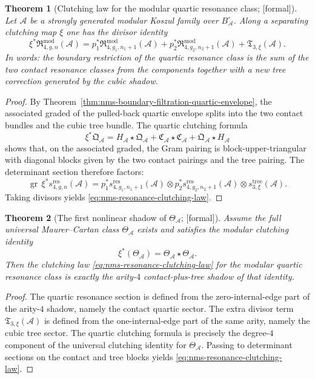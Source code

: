 \documentclass[11pt,oneside]{memoir}
\numberwithin{equation}{chapter}
\newtheorem{theorem}{Theorem}[chapter]
\theoremstyle{definition}
\newcommand{\ClaimStatusProvedHere}{\textnormal{[formal]}}
\newcommand{\cA}{\mathcal A}
\begin{document}
\begin{theorem}[Clutching law for the modular quartic resonance class; \ClaimStatusProvedHere]
\label{thm:nms-clutching-law-modular-resonance}
Let $\cA$ be a strongly generated modular Koszul family over $B_{\cA}^{\circ}$.  Along a separating clutching map $\xi$ one has the divisor identity
\begin{equation}
\label{eq:nms-resonance-clutching-law}
\xi^*\mathfrak R_{4,g,n}^{\mathrm{mod}}(\cA)
=
p_1^*\mathfrak R_{4,g_1,n_1+1}^{\mathrm{mod}}(\cA)
+
p_2^*\mathfrak R_{4,g_2,n_2+1}^{\mathrm{mod}}(\cA)
+
\mathfrak T_{3,\xi}(\cA).
\end{equation}
In words: the boundary restriction of the quartic resonance class is the sum of the two contact resonance classes from the components together with a new tree correction generated by the cubic shadow.
\end{theorem}

\begin{proof}
By Theorem~\ref{thm:nms-boundary-filtration-quartic-envelope}, the associated graded of the pulled-back quartic envelope splits into the two contact bundles and the cubic tree bundle.  The quartic clutching formula
\[
\xi^*\mathfrak Q_{\cA}
=
H_{\cA}\star\mathfrak Q_{\cA}
+
\mathfrak C_{\cA}\star\mathfrak C_{\cA}
+
\mathfrak Q_{\cA}\star H_{\cA}
\]
shows that, on the associated graded, the Gram pairing is block-upper-triangular with diagonal blocks given by the two contact pairings and the tree pairing.  The determinant section therefore factors:
\[
\operatorname{gr}\,\xi^*s_{4,g,n}^{\mathrm{res}}(\cA)
=
p_1^*s_{4,g_1,n_1+1}^{\mathrm{res}}(\cA)
\otimes
p_2^*s_{4,g_2,n_2+1}^{\mathrm{res}}(\cA)
\otimes
s_{3,\xi}^{\mathrm{tree}}(\cA).
\]
Taking divisors yields \eqref{eq:nms-resonance-clutching-law}.\qedhere
\end{proof}

\begin{theorem}[The first nonlinear shadow of \texorpdfstring{$\Theta_{\cA}$}{ThetaA}; \ClaimStatusProvedHere]
\label{thm:nms-first-nonlinear-shadow-theta}
Assume the full universal Maurer--Cartan class $\Theta_{\cA}$ exists and satisfies the modular clutching identity
\[
\xi^*(\Theta_{\cA})=\Theta_{\cA}\star \Theta_{\cA}.
\]
Then the clutching law \eqref{eq:nms-resonance-clutching-law} for the modular quartic resonance class is exactly the arity-$4$ contact-plus-tree shadow of that identity.
\end{theorem}

\begin{proof}
The quartic resonance section is defined from the zero-internal-edge part of the arity-$4$ shadow, namely the contact quartic sector.  The extra divisor term $\mathfrak T_{3,\xi}(\cA)$ is defined from the one-internal-edge part of the same arity, namely the cubic tree sector.  The quartic clutching formula is precisely the degree-$4$ component of the universal clutching identity for $\Theta_{\cA}$.  Passing to determinant sections on the contact and tree blocks yields \eqref{eq:nms-resonance-clutching-law}.\qedhere
\end{proof}
\end{document}
